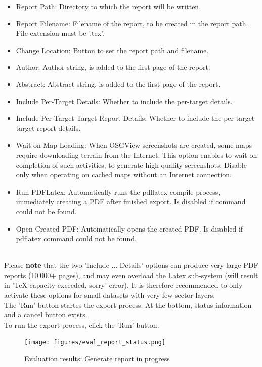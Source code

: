 \begin{itemize}  
\item Report Path: Directory to which the report will be written.
\item Report Filename: Filename of the report, to be created in the report path. File extension must be '.tex'.
\item Change Location: Button to set the report path and filename.
\item Author: Author string, is added to the first page of the report.
\item Abstract: Abstract string, is added to the first page of the report.
\item Include Per-Target Details: Whether to include the per-target details.
\item Include Per-Target Target Report Details: Whether to include the per-target target report details.
\item Wait on Map Loading: When OSGView screenshots are created, some maps require downloading terrain from the Internet.  This option enables to wait on completion of such activities, to generate high-quality screenshots. Disable only when operating on cached maps without an Internet connection.
\item Run PDFLatex: Automatically runs the pdflatex compile process, immediately creating a PDF after finished export. Is disabled if command could not be found.
\item Open Created PDF: Automatically opens the created PDF. Is disabled if pdflatex command could not be found.
\end{itemize}
\ \\

Please \textbf{note} that the two 'Include ... Details' options can produce very large PDF reports (10.000+ pages), and may even overload the Latex sub-system (will result in 'TeX capacity exceeded, sorry' error). It is therefore recommended to only activate these options for small datasets with very few sector layers. \\

The 'Run' button startes the export process. At the bottom, status information and a cancel button exists. \\

To run the export process, click the 'Run' button.

\begin{figure}[H]
    \texttt{[image: figures/eval\_report\_status.png]}
  \caption{Evaluation results: Generate report in progress}
\end{figure}

